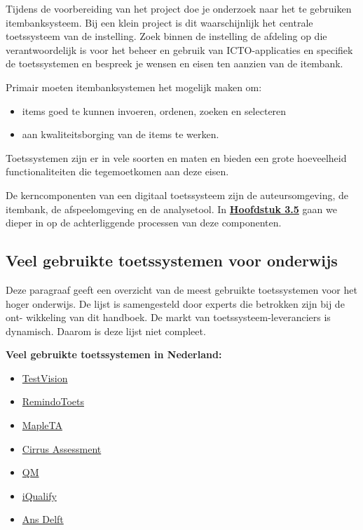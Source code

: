 \documentclass[
]{book}
\providecommand{\tightlist}{%
  \setlength{\itemsep}{0pt}\setlength{\parskip}{0pt}}
\begin{document}
Tijdens de voorbereiding van het project doe je onderzoek naar het te gebruiken itembanksysteem. Bij een klein project is dit waarschijnlijk het centrale toetssysteem van de instelling. Zoek binnen de instelling de afdeling op die verantwoordelijk is voor het beheer en gebruik van ICTO-applicaties en specifiek de toetssystemen en bespreek je wensen en eisen ten aanzien van de itembank.

Primair moeten itembanksystemen het mogelijk maken om:

\begin{itemize}
\tightlist
\item
  items goed te kunnen invoeren, ordenen, zoeken en selecteren
\item
  aan kwaliteitsborging van de items te werken.
\end{itemize}

Toetssystemen zijn er in vele soorten en maten en bieden een grote hoeveelheid functionaliteiten die tegemoetkomen aan deze eisen.

De kerncomponenten van een digitaal toetssysteem zijn de auteursomgeving, de itembank, de afspeelomgeving en de analysetool. In \textbf{\protect\hyperlink{organisatie-processtappen-rollen-en-rechten}{Hoofdstuk 3.5}} gaan we dieper in op de achterliggende processen van deze componenten.

\hypertarget{veel-gebruikte-toetssystemen-voor-onderwijs}{%
\subsection{Veel gebruikte toetssystemen voor onderwijs}\label{veel-gebruikte-toetssystemen-voor-onderwijs}}

Deze paragraaf geeft een overzicht van de meest gebruikte toetssystemen voor het hoger onderwijs. De lijst is samengesteld door experts die betrokken zijn bij de ont- wikkeling van dit handboek. De markt van toetssysteem-leveranciers is dynamisch. Daarom is deze lijst niet compleet.

\textbf{Veel gebruikte toetssystemen in Nederland:}

\begin{itemize}
\tightlist
\item
  \href{http://www.testvision.nl}{TestVision}
\item
  \href{https://www.paragin.nl/remindotoets/}{RemindoToets}
\item
  \href{https://www.maplesoft.com/products/mapleta/}{MapleTA}
\item
  \href{http://www.cirrusassessment.com/}{Cirrus Assessment}
\item
  \href{http://www.questionmark.com}{QM}
\item
  \href{www.infoland.nl/producten/iqualify}{iQualify}
\item
  \href{https://secure.ans-delft.nl/\%20Quiz-/}{Ans Delft}
\end{itemize}
\end{document}
